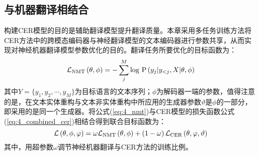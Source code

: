\subsection{与机器翻译相结合}
构建CER模型的目的是辅助翻译模型提升翻译质量。本章采用多任务训练方法将CER方法中的跨模态编码器与神经翻译模型的文本编码器进行参数共享，从而实现对神经机器翻译模型参数优化的目的。翻译任务所要优化的目标函数为：
\begin{equation}
\mathcal{L}_{\rm{NMT}} \left( \theta, \phi \right) =
    -\mathop{\sum}_j^M {\rm log}{\ }{\rm P} \left(y_j \vert y_{<j}, X \vert \theta, \phi \right)
\label{eq:4_nmt}
\end{equation}
其中$Y=\{y_1,y_2,\cdots,y_M\}$为目标语言的文本序列；$\phi$为解码器一端的参数，值得注意的是，在文本实体重构与文本非实体重构中所应用的生成器参数$\vartheta$是$\phi$的一部分，即采用的是同一个生成器。将公式(\ref{eq:4_nmt})与CER模型的损失函数公式(\ref{eq:4_combined_cer})相结合得到联合目标函数为：
\begin{equation}
\mathcal{L} \left( \theta, \phi, \varphi \right) = \omega\mathcal{L}_{\rm{NMT}} \left( \theta, \phi \right) + \left( 1-\omega \right) \mathcal{L}_{\rm{CER}} \left( \theta, \varphi, \vartheta \right)
\end{equation}
其中，用超参数$\omega$调节神经机器翻译与CER方法的训练比例。